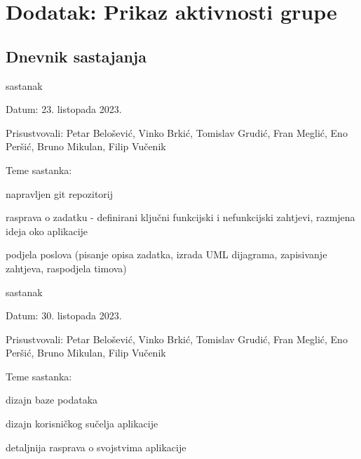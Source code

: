 \chapter*{Dodatak: Prikaz aktivnosti grupe}
		
		\section*{Dnevnik sastajanja}

		\begin{packed_enum}
			\item  sastanak
			
			\item[] \begin{packed_item}
				\item Datum: 23. listopada 2023.
				\item Prisustvovali: Petar Belošević, Vinko Brkić, Tomislav Grudić, Fran Meglić, Eno Peršić, Bruno Mikulan, Filip Vučenik
				\item Teme sastanka:
				\begin{packed_item}
					\item  napravljen git repozitorij
					\item  rasprava o zadatku - definirani ključni funkcijski i nefunkcijski zahtjevi, razmjena ideja oko aplikacije
					\item podjela poslova (pisanje opisa zadatka, izrada UML dijagrama, zapisivanje zahtjeva, raspodjela timova)
				\end{packed_item}
			\end{packed_item}
			
			\item  sastanak
			\item[] \begin{packed_item}
				\item Datum: 30. listopada 2023.
				\item Prisustvovali: Petar Belošević, Vinko Brkić, Tomislav Grudić, Fran Meglić, Eno Peršić, Bruno Mikulan, Filip Vučenik
				\item Teme sastanka:
				\begin{packed_item}
					\item  dizajn baze podataka
					\item  dizajn korisničkog sučelja aplikacije
					\item detaljnija rasprava o svojstvima aplikacije
				\end{packed_item}
			\end{packed_item}
			

\end{packed_enum}
